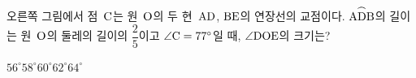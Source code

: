 \noindent\begin{minipage}[t]{0.58\linewidth}\vspace{0pt}\raggedright 오른쪽 그림에서 점~$\mathrm{C}$는 원~$\mathrm{O}$의 두 현~$\mathrm{AD}$, $\mathrm{BE}$의 연장선의 교점이다. $\overset{\frown}{\mathrm{ADB}}$의 길이는 원~$\mathrm{O}$의 둘레의 길이의 $\dfrac{2}{5}$이고 $\angle\mathrm{C}=77^\circ$일 때, $\angle\mathrm{DOE}$의 크기는?\end{minipage}\hfill\begin{minipage}[t]{0.4\linewidth}\vspace{0pt}\centering \resizebox{\ifdim\width>\linewidth\linewidth\else\width\fi}{!}{}\end{minipage}\par
\begin{choices32}{$56^\circ$}{$58^\circ$}{$60^\circ$}{$62^\circ$}{$64^\circ$}\end{choices32}
